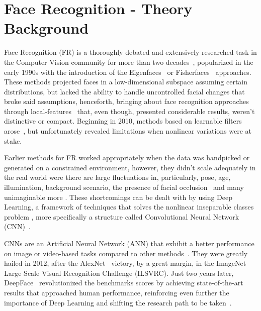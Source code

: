 \documentclass[class=report, crop=false, a4paper, 12pt]{standalone}
\begin{document}
\newpage

\section{Face Recognition - Theory Background}
Face Recognition (FR) is a thoroughly debated and extensively researched task in the Computer Vision community for more than two decades~\autocite{ranjanDeepLearningUnderstanding2018}, popularized in the early 1990s with the introduction of the Eigenfaces~\autocite{turkEigenfacesRecognition1991} or Fisherfaces~\autocite{p.n.belhumeurEigenfacesVsFisherfaces1997} approaches. These methods projected faces in a low-dimensional subspace assuming certain distributions, but lacked the ability to handle uncontrolled facial changes that broke said assumptions, henceforth, bringing about face recognition approaches through local-features~\autocite{chengjunliuGaborFeatureBased2002, ahonenFaceDescriptionLocal2006} that, even though, presented considerable results, weren't distinctive or compact. Beginning in 2010, methods based on learnable filters arose~\autocite{z.caoFaceRecognitionLearningbased2010,leiLearningDiscriminantFace2014}, but unfortunately revealed limitations when nonlinear variations were at stake.

\par Earlier methods for FR worked appropriately when the data was handpicked or generated on a constrained environment, however, they didn't scale adequately in the real world were there are large fluctuations in, particularly, pose, age, illumination, background scenario, the presence of facial occlusion~\autocite{ranjanDeepLearningUnderstanding2018} and many unimaginable more . These shortcomings can be dealt with by using Deep Learning, a framework of techniques that solves the nonlinear inseparable classes problem , more specifically a structure called Convolutional Neural Network (CNN)~\autocite{wangDeepFaceRecognition2021}. 

\par CNNs are an Artificial Neural Network (ANN) that exhibit a better performance on image or video-based tasks compared to other methods~\autocite{lecunGradientBasedLearningApplied1998}. They were greatly hailed in 2012, after the AlexNet~\autocite{krizhevskyImageNetClassificationDeep2012} victory, by a great margin, in the ImageNet Large Scale Visual Recognition Challenge (ILSVRC). Just two years later, DeepFace~\autocite{taigmanDeepFaceClosingGap2014} revolutionized the benchmarks scores by achieving state-of-the-art results that approached human performance, reinforcing even further the importance of Deep Learning and shifting the research path to be taken~\autocite{wangDeepFaceRecognition2021}.
\end{document}
